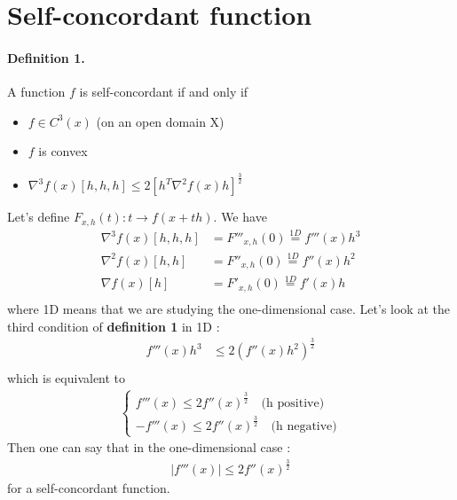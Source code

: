 %
%
%
%
%

\section{Self-concordant function}

\paragraph{Definition 1.} A function $f$ is self-concordant if and only if
\begin{itemize}
\item $f \in C^3(x)$ (on an open domain X)
\item $f$ is convex
\item $\nabla^3 f(x)[h,h,h] \le 2[h^T \nabla^2 f(x) h]^\frac{3}{2}$
\end{itemize}
Let's define $F_{x,h}(t) : t \rightarrow f(x+th)$. We have
\begin{align*}
\nabla^3 f(x)[h,h,h] & = F'''_{x,h}(0) \stackrel{1D}{=} f'''(x)h^3 \\
\nabla^2 f(x)[h,h] & = F''_{x,h}(0) \stackrel{1D}{=} f''(x)h^2\\
\nabla f(x)[h] & = F'_{x,h}(0) \stackrel{1D}{=} f'(x)h\\
\end{align*}
where 1D means that we are studying the one-dimensional case. Let's look at the third condition of \textbf{definition 1} in 1D :
\begin{align*}
f'''(x)h^3 & \le 2 (f''(x)h^2)^\frac{3}{2} \\
\end{align*}
which is equivalent to
\begin{align*}
\left\{
\begin{aligned}
f'''(x) \le 2f''(x)^\frac{3}{2} \quad \text{(h positive)} \\
-f'''(x) \le 2f''(x)^\frac{3}{2} \quad \text{(h negative)}
\end{aligned}
\right.
\end{align*}
Then one can say that in the one-dimensional case :
\begin{align*}
|f'''(x)| \le 2f''(x)^\frac{3}{2}
\end{align*}
for a self-concordant function.
